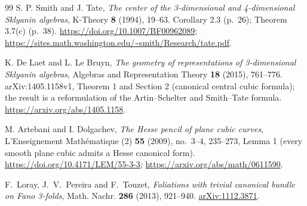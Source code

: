 \begin{thebibliography}{99}
S. P. Smith and J. Tate,
\emph{The center of the 3-dimensional and 4-dimensional Sklyanin algebras},
K-Theory \textbf{8} (1994), 19--63.
Corollary 2.3 (p.~26); Theorem 3.7(c) (p.~38).
\url{https://doi.org/10.1007/BF00962089};
\url{https://sites.math.washington.edu/~smith/Research/tate.pdf}.

K. De Laet and L. Le Bruyn,
\emph{The geometry of representations of 3-dimensional Sklyanin algebras},
Algebras and Representation Theory \textbf{18} (2015), 761--776.
arXiv:1405.1158v1, Theorem 1 and Section 2 (canonical central cubic formula);
the result is a reformulation of the Artin--Schelter and Smith--Tate formula.
\url{https://arxiv.org/abs/1405.1158}.

M. Artebani and I. Dolgachev,
\emph{The Hesse pencil of plane cubic curves},
L'Enseignement Math\'ematique (2) \textbf{55} (2009), no.~3--4, 235--273,
Lemma 1 (every smooth plane cubic admits a Hesse canonical form).
\url{https://doi.org/10.4171/LEM/55-3-3};
\url{https://arxiv.org/abs/math/0611590}.

F.~Loray, J.~V.~Pereira and F.~Touzet,
\emph{Foliations with trivial canonical bundle on Fano 3-folds},
Math. Nachr. \textbf{286} (2013), 921--940.
\href{https://arxiv.org/abs/1112.3871}{arXiv:1112.3871}.

\end{thebibliography}
